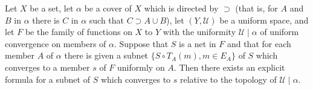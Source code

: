 Let $X$ be a set, let $\alpha$ be a cover of $X$ which is directed by $\supset$ (that is, for $A$ and $B$ in $\alpha$ there is $C$ in $\alpha$ such that $C \supset A \cup B$), let $(Y, \mathcal{U})$ be a uniform space, and let $F$ be the family of functions on $X$ to $Y$ with the uniformity $\mathcal{U} \mid \alpha$ of uniform convergence on members of $\alpha$. Suppose that $S$ is a net in $F$ and that for each member $A$ of $\alpha$ there is given a subnet $\{S \circ T_A(m), m \in E_A\}$ of $S$ which converges to a member $s$ of $F$ uniformly on $A$. Then there exists an explicit formula for a subnet of $S$ which converges to $s$ relative to the topology of $\mathcal{U} \mid \alpha$.
